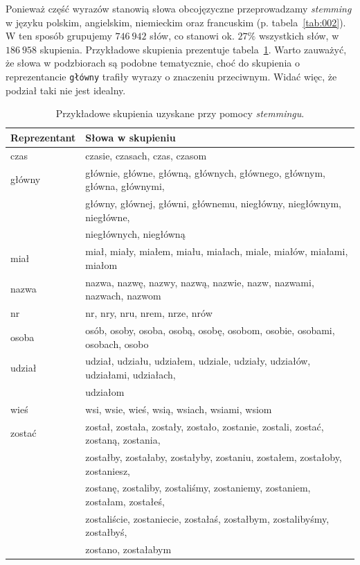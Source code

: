 \documentclass{praca1}
\begin{document}
Ponieważ część wyrazów stanowią słowa obcojęzyczne przeprowadzamy \emph{stemming} w języku polskim, angielskim, niemieckim oraz francuskim (p. tabela~\ref{tab:002}). W ten sposób grupujemy $746\ 942$ słów, co stanowi ok. $27\%$ wszystkich słów, w $186\ 958$ skupienia. Przykładowe skupienia prezentuje tabela~\ref{tab:003}. Warto zauważyć, że słowa w podzbiorach są podobne tematycznie, choć do skupienia o reprezentancie \verb|główny| trafiły wyrazy o znaczeniu przeciwnym. Widać więc, że podział taki nie jest idealny.

\begin{table}[!h]
\centering
\begin{tabular}{|l|l|}
  \hline
Reprezentant & Słowa w skupieniu \\ \hline
  \hline
czas & czasie, czasach, czas, czasom \\ \hline
  główny & głównie, główne, główną, głównych, głównego, głównym, główna, głównymi, \\
& główny, głównej, główni, głównemu, niegłówny, niegłównym, niegłówne, \\
& niegłównych, niegłówną \\ \hline
  miał & miał, miały, miałem, miału, miałach, miale, miałów, miałami, miałom \\ \hline
  nazwa & nazwa, nazwę, nazwy, nazwą, nazwie, nazw, nazwami, nazwach, nazwom \\ \hline
  nr & nr, nry, nru, nrem, nrze, nrów \\ \hline
  osoba & osób, osoby, osoba, osobą, osobę, osobom, osobie, osobami, osobach, osobo \\ \hline
  udział & udział, udziału, udziałem, udziale, udziały, udziałów, udziałami, udziałach, \\
& udziałom \\ \hline
  wieś & wsi, wsie, wieś, wsią, wsiach, wsiami, wsiom \\ \hline
  zostać & został, została, zostały, zostało, zostanie, zostali, zostać, zostaną, zostania, \\
& zostałby, zostałaby, zostałyby, zostaniu, zostałem, zostałoby, zostaniesz,\\
& zostanę, zostaliby, zostaliśmy, zostaniemy, zostaniem, zostałam, zostałeś, \\ 
& zostaliście, zostaniecie, zostałaś, zostałbym, zostalibyśmy, zostałbyś, \\
& zostano, zostałabym \\ 
   \hline
\end{tabular}
\caption{Przykładowe skupienia uzyskane przy pomocy \emph{stemmingu}.}
\label{tab:003}
\end{table}
\end{document}
